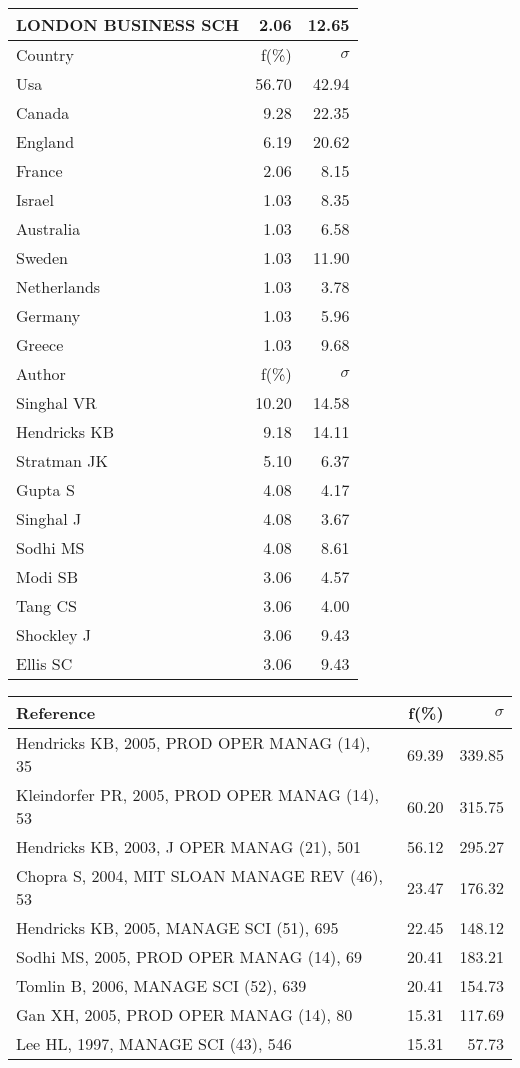 \documentclass[a4paper,11pt]{report}
\begin{document}
\begin{landscape}
\begin{table}[!ht]
{\begin{tabular}{|l r r|}
LONDON BUSINESS SCH & 2.06 & 12.65\\
\hline
\hline
Country & f(\%) & $\sigma$\\
\hline
Usa & 56.70 & 42.94\\
Canada & 9.28 & 22.35\\
England & 6.19 & 20.62\\
France & 2.06 & 8.15\\
Israel & 1.03 & 8.35\\
Australia & 1.03 & 6.58\\
Sweden & 1.03 & 11.90\\
Netherlands & 1.03 & 3.78\\
Germany & 1.03 & 5.96\\
Greece & 1.03 & 9.68\\
\hline
\hline
Author & f(\%) & $\sigma$\\
\hline
Singhal VR & 10.20 & 14.58\\
Hendricks KB & 9.18 & 14.11\\
Stratman JK & 5.10 & 6.37\\
Gupta S & 4.08 & 4.17\\
Singhal J & 4.08 & 3.67\\
Sodhi MS & 4.08 & 8.61\\
Modi SB & 3.06 & 4.57\\
Tang CS & 3.06 & 4.00\\
Shockley J & 3.06 & 9.43\\
Ellis SC & 3.06 & 9.43\\
\hline
\end{tabular}
}
{\scriptsize\begin{tabular}{|l r r|}
\hline
Reference & f(\%) & $\sigma$\\
\hline
Hendricks KB, 2005, PROD OPER MANAG (14), 35 & 69.39 & 339.85\\
Kleindorfer PR, 2005, PROD OPER MANAG (14), 53 & 60.20 & 315.75\\
Hendricks KB, 2003, J OPER MANAG (21), 501 & 56.12 & 295.27\\
Chopra S, 2004, MIT SLOAN MANAGE REV (46), 53 & 23.47 & 176.32\\
Hendricks KB, 2005, MANAGE SCI (51), 695 & 22.45 & 148.12\\
Sodhi MS, 2005, PROD OPER MANAG (14), 69 & 20.41 & 183.21\\
Tomlin B, 2006, MANAGE SCI (52), 639 & 20.41 & 154.73\\
Gan XH, 2005, PROD OPER MANAG (14), 80 & 15.31 & 117.69\\
Lee HL, 1997, MANAGE SCI (43), 546 & 15.31 & 57.73\\

\end{tabular}}
\end{table}
\end{landscape}
\end{document}
